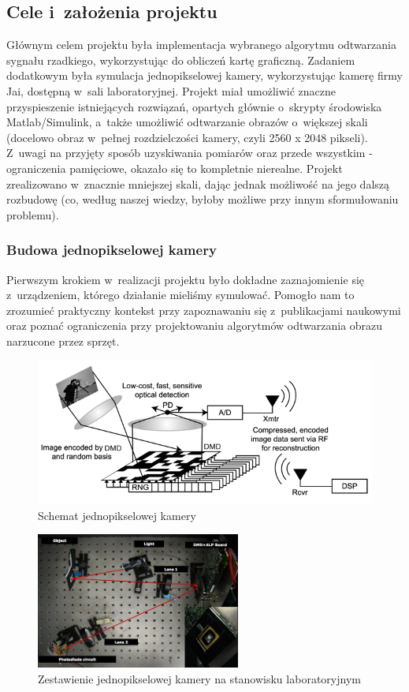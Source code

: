 \subsection{Cele i~założenia projektu}
Głównym celem projektu była implementacja wybranego algorytmu odtwarzania sygnału rzadkiego, wykorzystując do obliczeń kartę graficzną. Zadaniem dodatkowym była symulacja jednopikselowej kamery, wykorzystując kamerę firmy Jai, dostępną w~sali laboratoryjnej. Projekt miał umożliwić znaczne przyspieszenie istniejących rozwiązań, opartych głównie o~skrypty środowiska Matlab/Simulink, a~także umożliwić odtwarzanie obrazów o~większej skali (docelowo obraz w~pełnej rozdzielczości kamery, czyli 2560 x 2048 pikseli). Z~uwagi na przyjęty sposób uzyskiwania pomiarów oraz przede wszystkim - ograniczenia pamięciowe, okazało się to kompletnie nierealne. Projekt zrealizowano w~znacznie mniejszej skali, dając jednak możliwość na jego dalszą rozbudowę (co, według naszej wiedzy, byłoby możliwe przy innym sformułowaniu problemu).

\subsubsection{Budowa jednopikselowej kamery}
Pierwszym krokiem w~realizacji projektu było dokładne zaznajomienie się z~urządzeniem, którego działanie mieliśmy symulować. Pomogło nam to zrozumieć praktyczny kontekst przy zapoznawaniu się z~publikacjami naukowymi oraz poznać ograniczenia przy projektowaniu algorytmów odtwarzania obrazu narzucone przez sprzęt.

\begin{figure}
\centering
	\includegraphics[width=\textwidth]{rysunki/cscam.png}
\caption{Schemat jednopikselowej kamery}
\label{fig:singlePixelSchema}
\end{figure}

\begin{figure}
\centering
	\includegraphics[width=0.6\textwidth]{rysunki/cscamerasetup.jpg}
\caption{Zestawienie jednopikselowej kamery na stanowisku laboratoryjnym}
\label{fig:singlePixelSetup}
\end{figure}

